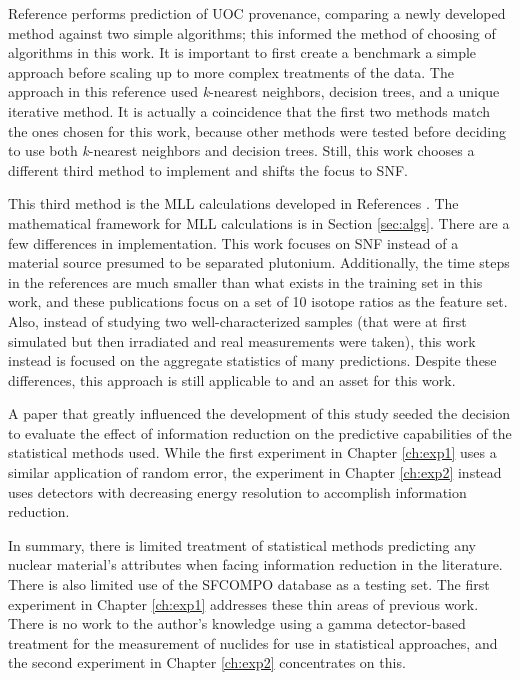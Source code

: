 Reference \cite{robel_2009} performs prediction of \gls{UOC} provenance,
comparing a newly developed method against two simple algorithms; this informed
the method of choosing of algorithms in this work. It is important to first
create a benchmark a simple approach before scaling up to more complex
treatments of the data. The approach in this reference used \textit{k}-nearest
neighbors, decision trees, and a unique iterative method.  It is actually a
coincidence that the first two methods match the ones chosen for this work,
because other methods were tested before deciding to use both
\textit{k}-nearest neighbors and decision trees. Still, this work chooses a
different third method to implement and shifts the focus to \gls{SNF}. 

This third method is the \gls{MLL} calculations developed in References
\cite{mll_method, mll_validate, mll_sensitivity}.  The mathematical framework
for \gls{MLL} calculations is in Section \ref{sec:algs}.  There are a few
differences in implementation. This work focuses on \gls{SNF} instead of a
material source presumed to be separated plutonium.  Additionally, the time
steps in the references are much smaller than what exists in the training set
in this work, and these publications focus on a set of 10 isotope ratios as the
feature set.  Also, instead of studying two well-characterized samples (that
were at first simulated but then irradiated and real measurements were taken),
this work instead is focused on the aggregate statistics of many predictions.
Despite these differences, this approach is still applicable to and an asset
for this work. 

A paper that greatly influenced the development of this study
\cite{dayman_feasibility_2013} seeded the decision to evaluate the effect of
information reduction on the predictive capabilities of the statistical methods
used.  While the first experiment in Chapter \ref{ch:exp1} uses a similar
application of random error, the experiment in Chapter \ref{ch:exp2} instead
uses detectors with decreasing energy resolution to accomplish information
reduction.

In summary, there is limited treatment of statistical methods predicting any
nuclear material's attributes when facing information reduction in the
literature.  There is also limited use of the \gls{SFCOMPO} database as a
testing set.  The first experiment in Chapter \ref{ch:exp1} addresses these
thin areas of previous work.  There is no work to the author's knowledge using
a gamma detector-based treatment for the measurement of nuclides for use in
statistical approaches, and the second experiment in Chapter \ref{ch:exp2}
concentrates on this.
